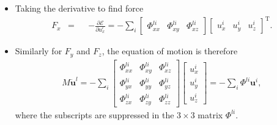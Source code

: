 \documentclass{beamer}
\newcommand*\vf[1]{\mathbf{#1}}
\begin{document}
\begin{frame}{}
\begin{itemize}
\item Taking the derivative to find force
\begin{align*}
F_x &=&&-\frac{\partial \mathcal{E}}{\partial u_x^l} = -\sum_i
\begin{bmatrix}
\Phi_{xx}^{li} & \Phi_{xy}^{li} & \Phi_{xz}^{li}
\end{bmatrix}
\begin{bmatrix}
u_x^i & u_y^i & u_z^i
\end{bmatrix}^\text{T}.
\end{align*}
\item Similarly for $F_y$ and $F_z$, the equation of motion is therefore
\begin{align}
\boxed{M \ddot{\vf{u}}^l = -\sum_i
\begin{bmatrix}
\Phi_{xx}^{li} & \Phi_{xy}^{li} & \Phi_{xz}^{li} \\
\Phi_{yx}^{li} & \Phi_{yy}^{li} & \Phi_{yz}^{li} \\
\Phi_{zx}^{li} & \Phi_{zy}^{li} & \Phi_{zz}^{li}
\end{bmatrix}
\begin{bmatrix}
u_x^i \\
u_y^i \\
u_z^i
\end{bmatrix} = -\sum_i \Phi^{li} \vf{u}^i}, \label{eq:phonon_motion}
\end{align}
where the subscripts are suppressed in the $3 \times 3$ matrix $\Phi^{li}$.
\end{itemize}
\end{frame}
\end{document}
